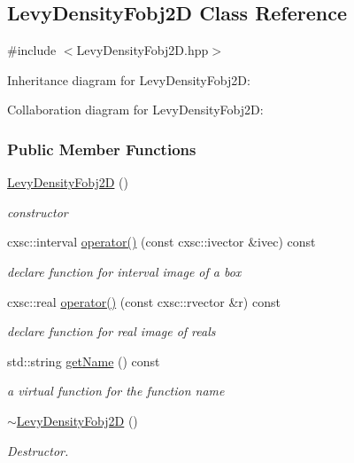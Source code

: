 \hypertarget{classLevyDensityFobj2D}{\subsection{\-Levy\-Density\-Fobj2\-D \-Class \-Reference}
\label{classLevyDensityFobj2D}
}


{\ttfamily \#include $<$\-Levy\-Density\-Fobj2\-D.\-hpp$>$}



\-Inheritance diagram for \-Levy\-Density\-Fobj2\-D\-:


\-Collaboration diagram for \-Levy\-Density\-Fobj2\-D\-:
\subsubsection*{\-Public \-Member \-Functions}
\begin{DoxyCompactItemize}
\item 
\hyperlink{classLevyDensityFobj2D_a3e8f6fe0ff3112777bffaed3fe8a745b}{\-Levy\-Density\-Fobj2\-D} ()
\begin{DoxyCompactList}\small\item\em constructor \end{DoxyCompactList}\item 
cxsc\-::interval \hyperlink{classLevyDensityFobj2D_addab3089660574b6397cc0a21b6dda52}{operator()} (const cxsc\-::ivector \&ivec) const 
\begin{DoxyCompactList}\small\item\em declare function for interval image of a box \end{DoxyCompactList}\item 
cxsc\-::real \hyperlink{classLevyDensityFobj2D_ae35555f858adb6678520d26573f8eb25}{operator()} (const cxsc\-::rvector \&r) const 
\begin{DoxyCompactList}\small\item\em declare function for real image of reals \end{DoxyCompactList}\item 
std\-::string \hyperlink{classLevyDensityFobj2D_ac03556f1ba0eb95471ecb494a5c936d6}{get\-Name} () const 
\begin{DoxyCompactList}\small\item\em a virtual function for the function name \end{DoxyCompactList}\item 
\hyperlink{classLevyDensityFobj2D_a99c27958b40bcf66375c8e53d12f333d}{$\sim$\-Levy\-Density\-Fobj2\-D} ()
\begin{DoxyCompactList}\small\item\em \-Destructor. \end{DoxyCompactList}\end{DoxyCompactItemize}
